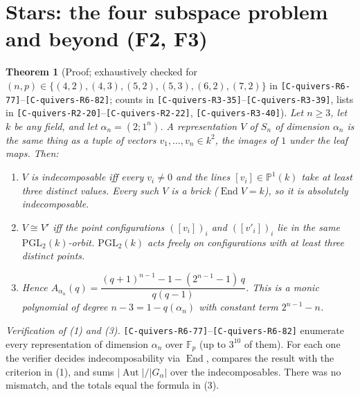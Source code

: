 \documentclass[11pt]{article}
\newtheorem{theorem}{Theorem}\newtheorem{proposition}[theorem]{Proposition}\newtheorem{corollary}[theorem]{Corollary}
\theoremstyle{definition}\newtheorem{definition}[theorem]{Definition}\newtheorem{remark}[theorem]{Remark}\newtheorem{observation}[theorem]{Numerical observation}
\newcommand{\C}[1]{\texttt{[C-#1]}}
\begin{document}
\section{Stars: the four subspace problem and beyond (F2, F3)}
\begin{theorem}[Proof; exhaustively checked for $(n,p)\in\{(4,2),(4,3),(5,2),(5,3),(6,2),(7,2)\}$ in \C{quivers-R6-77}--\C{quivers-R6-82}; counts in \C{quivers-R3-35}--\C{quivers-R3-39}, lists in \C{quivers-R2-20}--\C{quivers-R2-22}, \C{quivers-R3-40}]\label{thm:star}
Let $n\ge3$, let $k$ be any field, and let $\alpha_n=(2;1^n)$. A representation $V$ of $S_n$ of dimension $\alpha_n$ is the same thing as a tuple of
vectors $v_1,\dots,v_n\in k^2$, the images of $1$ under the leaf maps. Then:
\begin{enumerate}
\item $V$ is indecomposable iff every $v_i\neq0$ and the lines $[v_i]\in\mathbb P^1(k)$ take at least three distinct values. Every such $V$ is a brick
($\operatorname{End}V=k$), so it is absolutely indecomposable.
\item $V\cong V'$ iff the point configurations $([v_i])_i$ and $([v'_i])_i$ lie in the same $\mathrm{PGL}_2(k)$-orbit. $\mathrm{PGL}_2(k)$ acts freely on
configurations with at least three distinct points.
\item Hence $A_{\alpha_n}(q)=\dfrac{(q+1)^{n-1}-1-(2^{n-1}-1)\,q}{q(q-1)}$. This is a monic polynomial of degree $n-3=1-q(\alpha_n)$ with constant term
$2^{n-1}-n$.
\end{enumerate}
\end{theorem}
\noindent\emph{Verification of (1) and (3).} \C{quivers-R6-77}--\C{quivers-R6-82} enumerate every representation of dimension $\alpha_n$
over $\mathbb F_p$ (up to $3^{10}$ of them). For each one the verifier decides indecomposability via $\operatorname{End}$, compares the result with the criterion in (1),
and sums $|\operatorname{Aut}|/|G_\alpha|$ over the indecomposables. There was no mismatch, and the totals equal the formula in (3).
\end{document}
